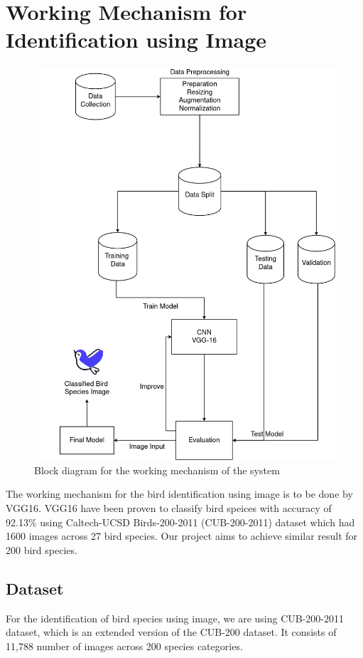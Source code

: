 \section{Working Mechanism for Identification using Image}
\begin{figure}[h!]
    \centering
        \includegraphics[scale=0.33]{images/Methodology2.png}
        \caption{Block diagram for the working mechanism of the system}%
    \end{figure}
The working mechanism for the bird identification using image is to be done by VGG16. VGG16 have been proven to classify bird speices with accuracy of 92.13\% using Caltech-UCSD Birds-200-2011 (CUB-200-2011) dataset which had 1600 images across 27 bird species\cite{islam2019bird}. Our project aims to achieve similar result for 200 bird species.

\subsection{Dataset}
For the identification of bird species using image, we are using CUB-200-2011 dataset, which is an extended version of the CUB-200 dataset. It consists of 11,788 number of images across 200 species categories\cite{WahCUB_200_2011}.

